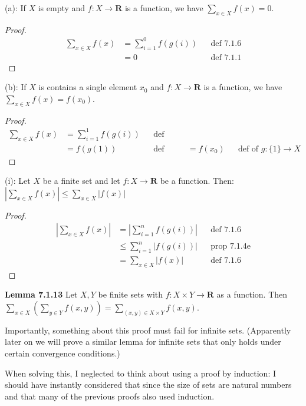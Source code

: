 \documentclass[answers,12pt]{exam}
\begin{document}
\begin{solution}

    (a): If $X$ is empty and $f: X \to \mathbf{R}$ is a function, we have $\sum_{x \in X}f(x) = 0$.
\begin{proof}
    \[
        \begin{aligned}
            \sum_{x \in X} f(x) &= \sum_{i=1}^{0} f(g(i)) && \text{def 7.1.6} \\
            &= 0 && \text{def 7.1.1}
        \end{aligned}
    \]
\end{proof}
(b): If $X$ is contains a single element $x_0$ and $f: X \to \mathbf{R}$ is a function, we have $\sum_{x \in X}f(x) = f(x_0)$.
\begin{proof}
    \[
        \begin{aligned}
            \sum_{x \in X} f(x) &= \sum_{i=1}^{1} f(g(i)) && \text{def 7.1.6} \\
            &= f(g(1)) && \text{def 7.1.1}
            &= f(x_0) && \text{def of $g: \{1\} \to X$}
        \end{aligned}
    \]
\end{proof}
(i): Let $X$ be a finite set and let $f: X \to \mathbf{R}$ be a function.
Then: $|\sum_{x \in X} f(x)| \leq \sum_{x \in X}|f(x)|$
\begin{proof}
    \[
        \begin{aligned}
            |\sum_{x \in X} f(x)| &= |\sum_{i = 1}^{n}f(g(i))| && \text{def 7.1.6}\\ 
            &\leq \sum_{i=1}^{n}|f(g(i))| && \text{prop 7.1.4e} \\
            &= \sum_{x \in X} |f(x)| && \text{def 7.1.6}
        \end{aligned}
    \]
\end{proof}
\end{solution}

\textbf{Lemma 7.1.13} Let $X,Y$ be finite sets with $f: X \times Y \to \mathbf{R}$ as a function.
Then $\sum_{x \in X}(\sum_{y \in Y} f(x,y)) = \sum_{(x,y) \in X \times Y} f(x,y)$.

Importantly, something about this proof must fail for infinite sets.
(Apparently later on we will prove a similar lemma for infinite sets that only holds under certain convergence conditions.)

When solving this, I neglected to think about using a proof by induction:
I should have instantly considered that since the size of sets are natural numbers and that many of the previous proofs also used induction.
\end{document}
